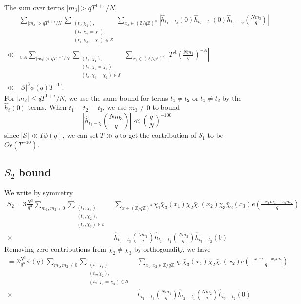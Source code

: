 The sum over terms $|m_3|>qT^{1+\epsilon}/N$,
\begin{align*}
   & \sum_{|m_3|>qT^{1+\epsilon}/N}\sum_{\substack{(t_1,\chi_1),\\(t_2,\chi_2=\chi_1),\\(t_3,\chi_3=\chi_1)\in\mathcal{S}}} \sum_{x_3\in (\mathbb{Z}/q\mathbb{Z})^{\times}}
   \left|\hat{h}_{t_1-t_3}\left(0\right)\hat{h}_{t_2-t_1}\left(0\right)\hat{h}_{t_3-t_2}\left(\frac{Nm_3}{q}\right)\right|\\
    \ll&_{\epsilon,A}  \sum_{|m_3|>qT^{1+\epsilon}/N}\sum_{\substack{(t_1,\chi_1),\\(t_2,\chi_2=\chi_1),\\(t_3,\chi_3=\chi_1)\in\mathcal{S}}} \sum_{x_3\in (\mathbb{Z}/q\mathbb{Z})^{\times}}
    \left|T^{A}\left(\frac{Nm_3}{q} \right)^{-A}\right|\\
    \ll & |\mathcal{S}|^3\phi(q) T^{-10}.
\end{align*}
For $|m_3|\leq qT^{1+\epsilon}/N$, we use the same bound for terms $t_1\neq t_2$ or $t_1\neq t_3$ by the $\hat{h}_t(0)$ terms. When $t_1=t_2=t_3$, we use $m_3\neq 0$
to bound \[
    \left|\hat{h}_{t_3-t_2}\left(\frac{Nm_3}{q}\right)\right| \ll \left(\frac{q}{N}\right)^{-100}
\]
since $|\mathcal{S}|\ll T\phi(q)$, we can set $T\gg q$ to get the contribution of $S_1$ to be $O\epsilon(T^{-10})$.
\subsection{$S_2$ bound}
We write by symmetry \begin{align*}
    S_2= 3\frac{N^3}{q^3}\sum_{m_1,m_2\neq 0}\sum_{\substack{(t_1,\chi_1),\\(t_2,\chi_2),\\(t_3,\chi_3)\in\mathcal{S}}} &\sum_{x\in (\mathbb{Z}/q\mathbb{Z})^3}\chi_1\bar{\chi}_3(x_1)\chi_2\bar{\chi}_1(x_2)\chi_3\bar{\chi}_2(x_3) e\left(\frac{-x_1m_1-x_2m_2}{q}\right)\\
    \times \ &\hat{h}_{t_1-t_3}\left(\frac{Nm_1}{q}\right)\hat{h}_{t_2-t_1}\left(\frac{Nm_2}{q}\right)\hat{h}_{t_3-t_2}\left(0\right)
\end{align*}
Removing zero contributions from $\chi_2\neq \chi_3$ by orthogonality,
we have \begin{align*}
    =3\frac{N^3}{q^3} \phi(q) \sum_{m_1,m_2\neq 0}\sum_{\substack{(t_1,\chi_1),\\(t_2,\chi_2),\\(t_3,\chi_3=\chi_2)\in\mathcal{S}}} &\sum_{x_1,x_2 \in \mathbb{Z}/q\mathbb{Z}}\chi_1\bar{\chi}_3(x_1)\chi_2\bar{\chi}_1(x_2) e\left(\frac{-x_1m_1-x_2m_2}{q}\right)\\
    \times \ &\hat{h}_{t_1-t_3}\left(\frac{Nm_1}{q}\right)\hat{h}_{t_2-t_1}\left(\frac{Nm_2}{q}\right)\hat{h}_{t_3-t_2}\left(0\right)
\end{align*}